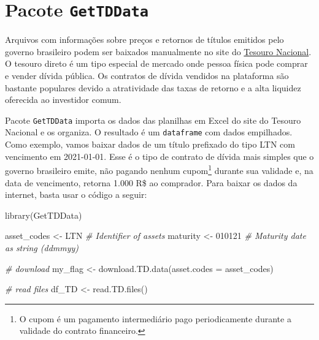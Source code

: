 \documentclass[
  11pt,
]{book}
\newenvironment{Shaded}{\begin{snugshade}}{\end{snugshade}}
\newcommand{\AttributeTok}[1]{\textcolor[rgb]{0.61,0.61,0.61}{#1}}
\newcommand{\CommentTok}[1]{\textcolor[rgb]{0.37,0.37,0.37}{\textit{#1}}}
\newcommand{\FunctionTok}[1]{\textcolor[rgb]{0,0,0}{#1}}
\newcommand{\NormalTok}[1]{#1}
\newcommand{\OtherTok}[1]{\textcolor[rgb]{0.37,0.37,0.37}{#1}}
\newcommand{\StringTok}[1]{\textcolor[rgb]{0.5,0.5,0.5}{#1}}
\begin{document}
\hypertarget{pacote-gettddata}{%
\section{\texorpdfstring{Pacote \texttt{GetTDData}}{Pacote GetTDData}}\label{pacote-gettddata}}

Arquivos com informações sobre preços e retornos de títulos emitidos pelo governo brasileiro podem ser baixados manualmente no site do \href{https://www.tesourodireto.com.br/}{Tesouro Nacional}. O tesouro direto é um tipo especial de mercado onde pessoa física pode comprar e vender dívida pública. Os contratos de dívida vendidos na plataforma são bastante populares devido a atratividade das taxas de retorno e a alta liquidez oferecida ao investidor comum.

Pacote \texttt{GetTDData} importa os dados das planilhas em Excel do site do Tesouro Nacional e os organiza. O resultado é um \texttt{dataframe} com dados empilhados. Como exemplo, vamos baixar dados de um título prefixado do tipo LTN com vencimento em 2021-01-01. Esse é o tipo de contrato de dívida mais simples que o governo brasileiro emite, não pagando nenhum cupom\footnote{O cupom é um pagamento intermediário pago periodicamente durante a validade do contrato financeiro.} durante sua validade e, na data de vencimento, retorna 1.000 R\$ ao comprador. Para baixar os dados da internet, basta usar o código a seguir:

  

\begin{Shaded}
\begin{Highlighting}[]
\FunctionTok{library}\NormalTok{(GetTDData)}

\NormalTok{asset\_codes }\OtherTok{\textless{}{-}} \StringTok{\textquotesingle{}LTN\textquotesingle{}}   \CommentTok{\# Identifier of assets}
\NormalTok{maturity }\OtherTok{\textless{}{-}} \StringTok{\textquotesingle{}010121\textquotesingle{}}  \CommentTok{\# Maturity date as string (ddmmyy)}

\CommentTok{\# download}
\NormalTok{my\_flag }\OtherTok{\textless{}{-}} \FunctionTok{download.TD.data}\NormalTok{(}\AttributeTok{asset.codes =}\NormalTok{ asset\_codes)}

\CommentTok{\# read files}
\NormalTok{df\_TD }\OtherTok{\textless{}{-}} \FunctionTok{read.TD.files}\NormalTok{()}
\end{Highlighting}
\end{Shaded}
\end{document}
